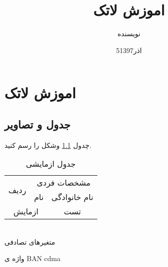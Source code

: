 \documentclass{book}
\author{نویسنده}
\title{اموزش لاتک}
\date{5اذر1397}
\begin{document}
	\maketitle
	\tableofcontents
	\listoffigures
	\listoftables
	\chapter{اموزش لاتک}
	\section{جدول و تصاویر}
	چدول 
	\ref{جدول یک}
	وشکل   را رسم کنید.
	\begin{table}
		\caption{جدول ازمایشی}
		\label{جدول یک}
		\begin{tabular}{|c||c||c|}
			\hline
			\multirow{2}{*}{ردیف}&
			
			\multicolumn{2}{|c|}{مشخصات فردی} 
			\\ \cline{2-3}
			&  نام&نام خانوادگی
			\\
			\hline
			\multicolumn{2}{|c||}{ازمایش}&
			تست
			\\ 
			\hline
		\end{tabular}
	\end{table}
	\\متغیرهای تصادفی
	
	واژه ی 
	BAN 
	cdma 
\end{document}
